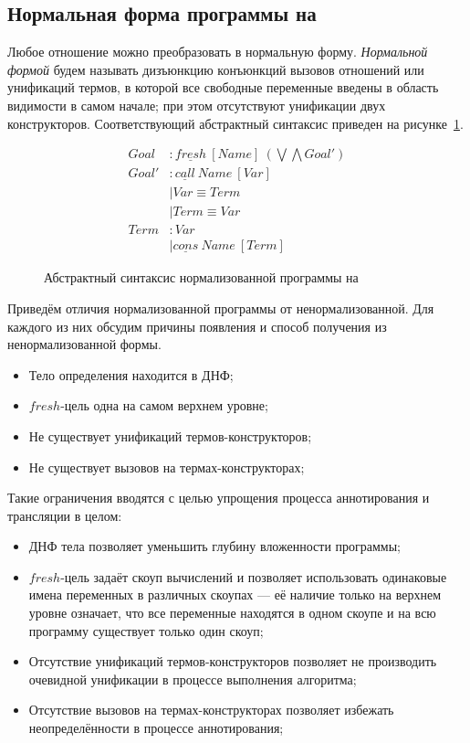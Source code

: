 \subsection{Нормальная форма программы на \miniKanren{}}

Любое отношение \miniKanren{} можно преобразовать в нормальную форму.
\emph{Нормальной формой} будем называть дизъюнкцию конъюнкций вызовов отношений или унификаций термов, в которой все свободные переменные введены в область видимости в самом начале; при этом отсутствуют унификации двух конструкторов.
Соответствующий абстрактный синтаксис приведен на рисунке~\ref{fig:normmk}.

\begin{figure}
    \begin{align*}
      Goal  &: \underline{fresh} \ [Name] \ (\bigvee \bigwedge Goal') \\
      Goal' &: \underline{call} \ Name \ [Var] \\
            &\mid Var \equiv Term \\
            &\mid Term \equiv Var \\
      Term  &: Var \\ 
            &\mid \underline{cons} \ Name \ [Term]
    \end{align*}
    \caption{Абстрактный синтаксис нормализованной программы на \miniKanren{}}
    \label{fig:normmk}
\end{figure}

Приведём отличия нормализованной программы от ненормализованной.
Для каждого из них обсудим причины появления и способ получения из ненормализованной формы.
\begin{itemize}
    \item Тело определения находится в ДНФ;
    \item $fresh$-цель одна на самом верхнем уровне;
    \item Не существует унификаций термов-конструкторов;
    \item Не существует вызовов на термах-конструкторах;
\end{itemize}

Такие ограничения вводятся с целью упрощения процесса аннотирования и трансляции в целом:
\begin{itemize}
    \item ДНФ тела позволяет уменьшить глубину вложенности программы;
    \item $fresh$-цель задаёт скоуп вычислений и позволяет использовать одинаковые имена переменных в различных скоупах --- её наличие только на верхнем уровне означает, что все переменные находятся в одном скоупе и на всю программу существует только один скоуп;
    \item Отсутствие унификаций термов-конструкторов позволяет не производить очевидной унификации в процессе выполнения алгоритма;
    \item Отсутствие вызовов на термах-конструкторах позволяет избежать неопределённости в процессе аннотирования;
\end{itemize}

